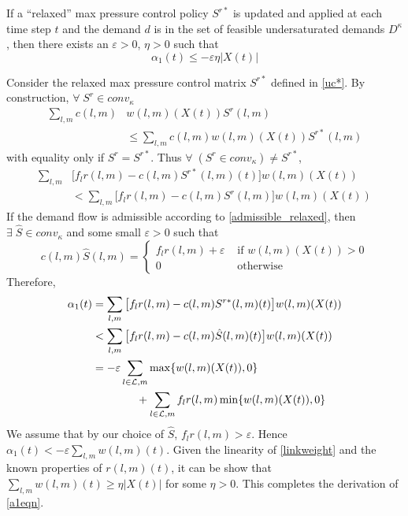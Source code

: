  \begin{Lem} \label{alpha1bound}
If a ``relaxed'' max pressure control policy $S^{r*}$ is updated and applied at each time step $t$ and the demand $d$ is in the set of feasible undersaturated demands $D^\kappa$, then there exists an $\varepsilon>0$, $\eta>0$ such that 
\begin{equation} \label{a1eqn} 
\alpha_1(t)  \leq -\varepsilon \eta \big| X(t)\big| 
\end{equation}
\end{Lem}
\begin{IEEEproof}
Consider the relaxed max pressure control matrix $S^{r*}$ defined in \eqref{uc*}. By construction, $ \forall \; S^r \in conv_{\kappa}$
\begin{align} \nonumber
\sum_{l,m}c(l,m)& w(l,m)(X(t))S^r (l,m) \\
&\leq \sum_{l,m}c(l,m)w(l,m)(X(t))S^{r*}(l,m) 
\end{align}
with equality only if $S^r = S^{r*}$. 
Thus $\forall \; (S^r  \in conv_{\kappa}) \neq S^{r*}$,
\begin{align} \nonumber
 \sum_{l,m}&\big[f_{l}r(l,m) - c(l,m)S^{r*}(l,m)(t)\big]w(l,m)(X(t)) \\
&<   \sum_{l,m}\big[f_{l}r(l,m) - c(l,m)S^r(l,m)\big]w(l,m)(X(t))
\end{align}
If the demand flow is admissible according to \eqref{admissible_relaxed}, then 
$\exists \; \hat{S} \in conv_{\kappa}$ and some small $\varepsilon>0$ such that 
\begin{equation} \nonumber
c(l,m)\hat{S} (l,m) = \begin{cases}
        f_{l}r(l,m) + \varepsilon & \text{ if } w(l,m)(X(t)) > 0 \\
        0 & \text{ otherwise}
    \end{cases}
\end{equation}
Therefore, 
\begin{align} \nonumber
 \alpha_1(t) &= \sum_{l,m}\big[f_{l}r(l,m) -  c(l,m)S^{r*}(l,m)(t)\big] w(l,m)(X(t))  \\ \nonumber
 &< \sum_{l,m}\big[f_{l}r(l,m) -  c(l,m)\hat{S}(l,m)(t)\big] w(l,m)(X(t)) \\ 
&  = -\varepsilon \sum_{l \in \mathcal{L},m} \max\{w(l,m)(X(t)) ,0\} \\ \nonumber
&\qquad \qquad +  \sum_{l \in \mathcal{L},m}  f_l r(l,m)  \min\{ w(l,m)(X(t)) ,0\}
\end{align}
We assume that by our choice of $\hat{S}$, $f_{l}r(l,m) > \varepsilon$. Hence
$\alpha_1(t) < -\varepsilon \sum_{l,m}w(l,m)(t)$. 
Given the linearity of \eqref{linkweight} and the known properties of $r(l,m)(t)$, it can be show that $\sum_{l,m}w(l,m)(t) \geq \eta |X(t)|$ for some $\eta >0$. This completes the derivation of \eqref{a1eqn}.
\end{IEEEproof}

